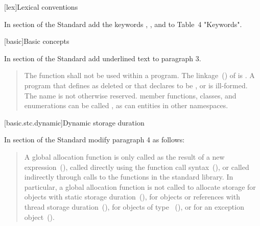 [lex]{Lexical conventions}

In section  of the \Cpp Standard 
add the keywords , , and
 to Table~4 "Keywords".


[basic]{Basic concepts}



In section  of the \Cpp Standard 
add underlined text to paragraph 3.

\begin{quote}
	\setcounter{Paras}{2}
	
	\pnum
	The function  shall not be used within
	a program.
	The linkage~() of  is
	. A program that defines  as
	deleted or that declares  to be
	 , or  is ill-formed. 
	The name  is
	not otherwise reserved. \enterexample member functions, classes, and
	enumerations can be called , as can entities in other
	namespaces. \exitexample
\end{quote}

[basic.stc.dynamic]{Dynamic storage duration}


In section  of the \Cpp Standard 
modify paragraph 4 as follows:

\begin{quote}
	\setcounter{Paras}{3}
	\pnum
	A global allocation function is only called as the result of a new
	expression~(),  called directly using the function call
	syntax~(), 
	or called indirectly through calls to the
	functions in the \Cpp standard library. \enternote In particular, a
	global allocation function is not called to allocate storage for objects
	with static storage duration~(), for objects or references
	with thread storage duration~(), for objects of
	type ~(), or for an
	exception object~().
	\exitnote
\end{quote}

